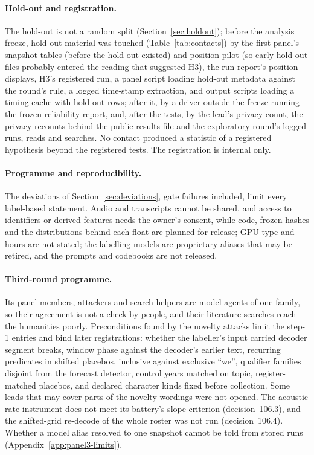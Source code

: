 \paragraph{Hold-out and registration.} The hold-out is not a random split (Section~\ref{sec:holdout}); before the analysis freeze, hold-out material was touched (Table~\ref{tab:contacts}) by the first panel's snapshot tables (before the hold-out existed) and position pilot (so early hold-out files probably entered the reading that suggested H3), the run report's position displays, H3's registered run, a panel script loading hold-out metadata against the round's rule, a logged time-stamp extraction, and output scripts loading a timing cache with hold-out rows; after it, by a driver outside the freeze running the frozen reliability report, and, after the tests, by the lead's privacy count, the privacy recounts behind the public results file and the exploratory round's logged runs, reads and searches. No contact produced a statistic of a registered hypothesis beyond the registered tests. The registration is internal only.

\paragraph{Programme and reproducibility.} The deviations of Section~\ref{sec:deviations}, gate failures included, limit every label-based statement. Audio and transcripts cannot be shared, and access to identifiers or derived features needs the owner's consent, while code, frozen hashes and the distributions behind each float are planned for release; GPU type and hours are not stated; the labelling models are proprietary aliases that may be retired, and the prompts and codebooks are not released.

\paragraph{Third-round programme.} Its panel members, attackers and search helpers are model agents of one family, so
their agreement is not a check by people, and their literature searches reach the humanities poorly. Preconditions
found by the novelty attacks limit the step-1 entries and bind later registrations: whether the labeller's input
carried decoder segment breaks, window phase against the decoder's earlier text, recurring predicates in shifted
placebos, inclusive against exclusive ``we'', qualifier families disjoint from the forecast detector, control years
matched on topic, register-matched placebos, and declared character kinds fixed before collection. Some leads that may
cover parts of the novelty wordings were not opened. The acoustic rate instrument does not meet its
battery's slope criterion (decision~106.3), and the shifted-grid re-decode of the whole roster was not run
(decision~106.4). Whether a model alias resolved to one snapshot cannot be told from
stored runs (Appendix~\ref{app:panel3-limits}).
